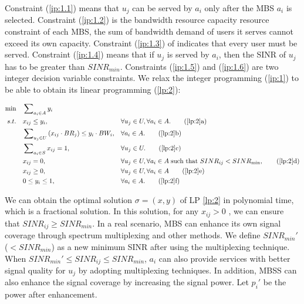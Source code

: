 \documentclass[11pt,a4paper]{article}
\begin{document}
Constraint (\ref{ip:1.1}) means that $u_j$ can be served by $a_i$ only after the MBS $a_i$ is selected. Constraint (\ref{ip:1.2}) is the bandwidth resource capacity resource constraint of each MBS, the sum of bandwidth demand of users it serves cannot exceed its own capacity. Constraint (\ref{ip:1.3}) of indicates that every user must be served. Constraint (\ref{ip:1.4}) means that if $u_j$ is served by $a_i$, then the SINR of $u_j$ has to be greater than $SINR_{min}$. Constraints (\ref{ip:1.5}) and (\ref{ip:1.6}) are two integer decision variable constraints. We relax the integer programming (\ref{ip:1}) to be able to obtain its linear programming (\ref{lp:2}):

\begin{align}
	\min \quad & \sum\nolimits_{{a_i} \in A} {{y_i}}&&  \label{lp:2}\\
	s.t.\quad &  {x_{ij}} \le {y_i},&&\forall {u_j} \in U,\forall {a_i} \in A. \tag{\ref{lp:2}{a}}\label{lp:2.1}\\
	&  \sum\nolimits_{{u_j} \in U} {({x_{ij}} \cdot B{R_j})}  \le {y_i} \cdot B{W_i},&&\forall {a_i} \in A. \tag{\ref{lp:2}{b}}\label{lp:2.2}\\
	&  \sum\nolimits_{{a_i} \in S} {{x_{ij}}}  = 1,&&\forall {u_j} \in U. \tag{\ref{lp:2}{c}}\label{lp:2.3}\\
	&  {x_{ij}} = 0,&&\forall {u_j} \in U,\forall {a_i} \in A\;{\text{such that }}SIN{R_{ij}} < SIN{R_{\min }}, \tag{\ref{lp:2}{d}}\label{lp:2.4}\\
	&  {x_{ij}} \ge 0,&&\forall u_j \in U,\forall {a_i} \in A \tag{\ref{lp:2}{e}}\label{lp:2.5}\\
	&  0 \le {y_i} \le 1,&&\forall {a_i} \in A. \tag{\ref{lp:2}{f}}\label{lp:2.6}
\end{align}

We can obtain the optimal solution $\sigma=(x,y)$ of LP \ref{lp:2} in polynomial time, which is a fractional solution. In this solution, for any $x_{ij}>0$ , we can ensure that $SINR_{ij}\ge SINR_{min}$. In a real scenario, MBS can enhance its own signal coverage through spectrum multiplexing and other methods. We define $SINR_{min}'$($<SINR_{min}$) as a new minimum SINR after using the multiplexing technique. When $SINR_{min}' \le SINR_{ij} \le SINR_{min}$, $a_i$ can also provide services with better signal quality for $u_j$ by adopting multiplexing techniques. In addition, MBSS can also enhance the signal coverage by increasing the signal power. Let $p_i'$ be the power after enhancement.
\end{document}
